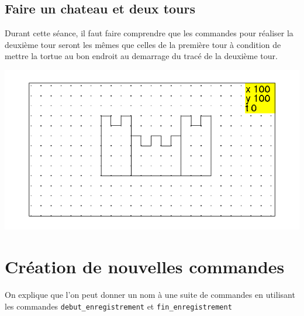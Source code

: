 \documentclass[a4paper,11pt]{book}
\begin{document}
\subsection{Faire un chateau et deux tours}
Durant cette s\'eance, il faut faire comprendre que les commandes pour 
r\'ealiser la deuxi\`eme tour seront les m\^emes que celles de la premi\`ere 
tour \`a condition de mettre la tortue au bon endroit au demarrage du trac\'e
 de la deuxi\`eme tour.

\begin{center}\includegraphics[width=\textwidth]{tortuech}\end{center}

\section{Cr\'eation de nouvelles commandes}
On explique  que l'on peut donner un nom \`a une suite de commandes en
 utilisant les commandes {\tt debut\_enregistrement} et 
{\tt fin\_enregistrement}
\end{document}
